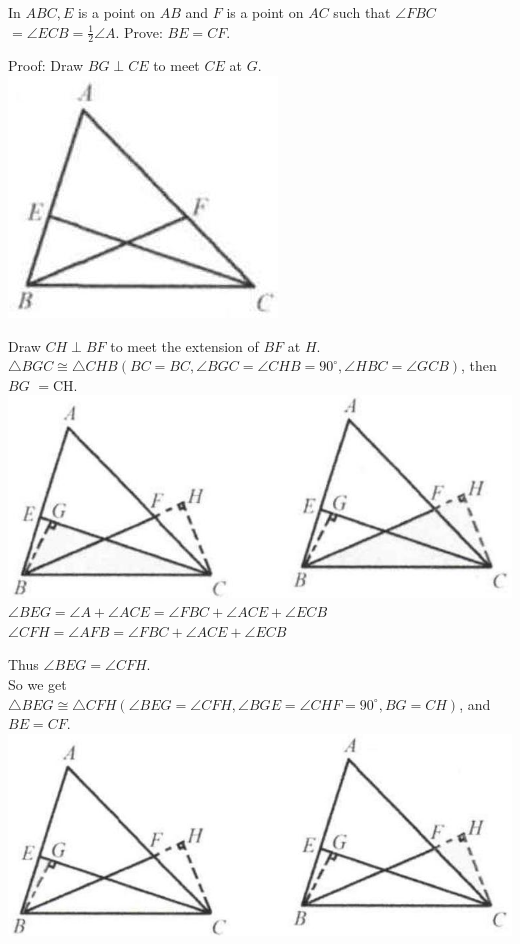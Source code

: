 \documentclass{article}
\begin{document}
In \(A B C, E\) is a point on \(A B\) and \(F\) is a point on \(A C\) such that \(\angle F B C\) \(=\angle E C B=\frac{1}{2} \angle A\). Prove: \(B E=C F\).

Proof:
Draw \(B G \perp C E\) to meet \(C E\) at \(G\).\\
\centering
\includegraphics[width=\textwidth]{images/085(2).jpg}

Draw \(C H \perp B F\) to meet the extension of \(B F\) at \(H\).\\
\(\triangle B G C \cong \triangle C H B\left(B C=B C, \angle B G C=\angle C H B=90^{\circ}, \angle H B C=\angle G C B\right)\), then \(B G\) \(=\mathrm{CH}\).\\
\centering
\includegraphics[width=\textwidth]{images/085(1).jpg}\\
\(\angle B E G=\angle A+\angle A C E=\angle F B C+\angle A C E+\angle E C B\)\\
\(\angle C F H=\angle A F B=\angle F B C+\angle A C E+\angle E C B\)

Thus \(\angle B E G=\angle C F H\).\\
So we get \(\triangle B E G \cong \triangle C F H\left(\angle B E G=\angle C F H, \angle B G E=\angle C H F=90^{\circ}, B G=C H\right)\), and \(B E=C F\).\\
\centering
\includegraphics[width=\textwidth]{images/085.jpg}
\end{document}
